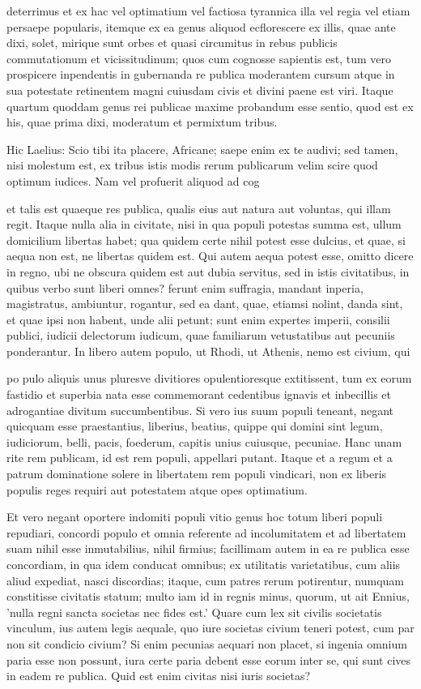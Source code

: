  deterrimus et ex hac vel optimatium vel factiosa tyrannica illa vel regia vel etiam persaepe popularis, itemque ex ea genus aliquod ecflorescere ex illis, quae ante dixi, solet, mirique sunt orbes et quasi circumitus in rebus publicis commutationum et vicissitudinum; quos cum cognosse sapientis est, tum vero prospicere inpendentis in gubernanda re publica moderantem cursum atque in sua potestate retinentem magni cuiusdam civis et divini paene est viri. Itaque quartum quoddam genus rei publicae maxime probandum esse sentio, quod est ex his, quae prima dixi, moderatum et permixtum tribus.

 Hic Laelius: Scio tibi ita placere, Africane; saepe enim ex te audivi; sed tamen, nisi molestum est, ex tribus istis modis rerum publicarum velim scire quod optimum iudices. Nam vel profuerit aliquod ad cog

 et talis est quaeque res publica, qualis eius aut natura aut voluntas, qui illam regit. Itaque nulla alia in civitate, nisi in qua populi potestas summa est, ullum domicilium libertas habet; qua quidem certe nihil potest esse dulcius, et quae, si aequa non est, ne libertas quidem est. Qui autem aequa potest esse, omitto dicere in regno, ubi ne obscura quidem est aut dubia servitus, sed in istis civitatibus, in quibus verbo sunt liberi omnes? ferunt enim suffragia, mandant inperia, magistratus, ambiuntur, rogantur, sed ea dant, quae, etiamsi nolint, danda sint, et quae ipsi non habent, unde alii petunt; sunt enim expertes imperii, consilii publici, iudicii delectorum iudicum, quae familiarum vetustatibus aut pecuniis ponderantur. In libero autem populo, ut Rhodi, ut Athenis, nemo est civium, qui

 po pulo aliquis unus pluresve divitiores opulentioresque extitissent, tum ex eorum fastidio et superbia nata esse commemorant cedentibus ignavis et inbecillis et adrogantiae divitum succumbentibus. Si vero ius suum populi teneant, negant quicquam esse praestantius, liberius, beatius, quippe qui domini sint legum, iudiciorum, belli, pacis, foederum, capitis unius cuiusque, pecuniae. Hanc unam rite rem publicam, id est rem populi, appellari putant. Itaque et a regum et a patrum dominatione solere in libertatem rem populi vindicari, non ex liberis populis reges requiri aut potestatem atque opes optimatium.

 Et vero negant oportere indomiti populi vitio genus hoc totum liberi populi repudiari, concordi populo et omnia referente ad incolumitatem et ad libertatem suam nihil esse inmutabilius, nihil firmius; facillimam autem in ea re publica esse concordiam, in qua idem conducat omnibus; ex utilitatis varietatibus, cum aliis aliud expediat, nasci discordias; itaque, cum patres rerum potirentur, numquam constitisse civitatis statum; multo iam id in regnis minus, quorum, ut ait Ennius, 'nulla regni sancta societas nec fides est.' Quare cum lex sit civilis societatis vinculum, ius autem legis aequale, quo iure societas civium teneri potest, cum par non sit condicio civium? Si enim pecunias aequari non placet, si ingenia omnium paria esse non possunt, iura certe paria debent esse eorum inter se, qui sunt cives in eadem re publica. Quid est enim civitas nisi iuris societas?

